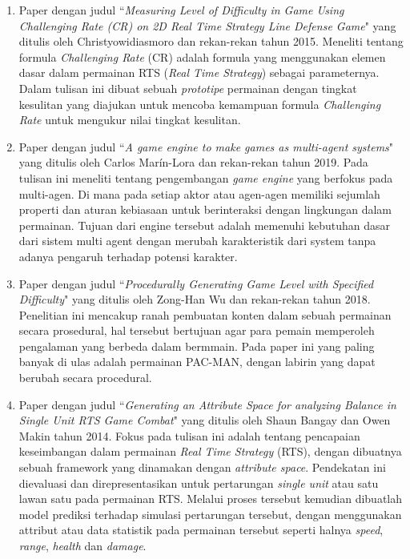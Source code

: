 \begin{enumerate}
	\item Paper dengan judul ``\textit{Measuring Level of Difficulty in Game Using Challenging Rate (CR) on 2D Real Time Strategy Line Defense Game}" yang ditulis oleh Christyowidiasmoro dan rekan-rekan tahun 2015. Meneliti tentang formula \textit{Challenging Rate} (CR) adalah formula yang menggunakan elemen dasar dalam permainan RTS (\textit{Real Time Strategy}) sebagai parameternya. Dalam tulisan ini dibuat sebuah \textit{prototipe} permainan dengan tingkat kesulitan yang diajukan untuk mencoba kemampuan formula \textit{Challenging Rate} untuk mengukur nilai tingkat kesulitan.

	\item Paper dengan judul ``\textit{A game engine to make games as multi-agent systems}" yang ditulis oleh Carlos Marín-Lora dan rekan-rekan tahun 2019. Pada tulisan ini meneliti tentang pengembangan \textit{game engine} yang berfokus pada multi-agen. Di mana pada setiap aktor atau agen-agen memiliki sejumlah properti dan aturan kebiasaan untuk berinteraksi dengan lingkungan dalam permainan. Tujuan dari engine tersebut adalah memenuhi kebutuhan dasar dari sistem multi agent dengan merubah karakteristik dari system tanpa adanya pengaruh terhadap potensi karakter.

	\item Paper dengan judul ``\textit{Procedurally Generating Game Level with Specified Difficulty}" yang ditulis oleh Zong-Han Wu dan rekan-rekan tahun 2018. Penelitian ini mencakup ranah pembuatan konten dalam sebuah permainan secara prosedural, hal tersebut bertujuan agar para pemain memperoleh pengalaman yang berbeda dalam bermmain. Pada paper ini yang paling banyak di ulas adalah permainan PAC-MAN, dengan labirin yang dapat berubah secara procedural.
	
	\item Paper dengan judul ``\textit{Generating an Attribute Space for analyzing Balance in Single Unit RTS Game Combat}" yang ditulis oleh Shaun Bangay dan Owen Makin tahun 2014. Fokus pada tulisan ini adalah tentang pencapaian keseimbangan dalam permainan \textit{Real Time Strategy} (RTS), dengan dibuatnya sebuah framework yang dinamakan dengan \textit{attribute space}. Pendekatan ini dievaluasi dan direpresentasikan untuk pertarungan \textit{single unit} atau satu lawan satu pada permainan RTS. Melalui proses tersebut kemudian dibuatlah model prediksi terhadap simulasi pertarungan tersebut, dengan menggunakan attribut atau data statistik pada permainan tersebut seperti halnya \textit{speed}, \textit{range}, \textit{health} dan \textit{damage}.
\end{enumerate}

